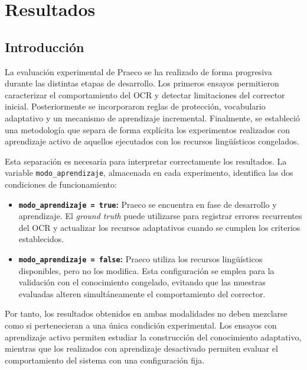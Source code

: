
\chapter{Resultados}

\section{Introducción}
La evaluación experimental de Praeco se ha realizado de forma progresiva durante las distintas etapas de desarrollo. Los primeros ensayos permitieron caracterizar el comportamiento del OCR y detectar limitaciones del corrector inicial. Posteriormente se incorporaron reglas de protección, vocabulario adaptativo y un mecanismo de aprendizaje incremental. Finalmente, se estableció una metodología que separa de forma explícita los experimentos realizados con aprendizaje activo de aquellos ejecutados con los recursos lingüísticos congelados.

Esta separación es necesaria para interpretar correctamente los resultados. La variable \texttt{modo\_aprendizaje}, almacenada en cada experimento, identifica las dos condiciones de funcionamiento:

\begin{itemize}[noitemsep]
	\item \textbf{\texttt{modo\_aprendizaje = true}:} Praeco se encuentra en fase de desarrollo y aprendizaje. El \textit{ground truth} puede utilizarse para registrar errores recurrentes del OCR y actualizar los recursos adaptativos cuando se cumplen los criterios establecidos.
	\item \textbf{\texttt{modo\_aprendizaje = false}:} Praeco utiliza los recursos lingüísticos disponibles, pero no los modifica. Esta configuración se emplea para la validación con el conocimiento congelado, evitando que las muestras evaluadas alteren simultáneamente el comportamiento del corrector.
\end{itemize}

Por tanto, los resultados obtenidos en ambas modalidades no deben mezclarse como si pertenecieran a una única condición experimental. Los ensayos con aprendizaje activo permiten estudiar la construcción del conocimiento adaptativo, mientras que los realizados con aprendizaje desactivado permiten evaluar el comportamiento del sistema con una configuración fija.

